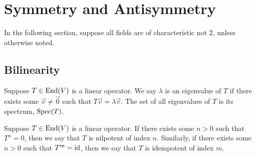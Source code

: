 \section{Symmetry and Antisymmetry}

\begin{remark}
    In the following section,
    suppose all fields are of characteristic not 2,
    unless otherwise noted.
\end{remark}

\subsection*{Bilinearity}

\begin{definition}
    Suppose \(T \in \operatorname{End}(V)\) is a linear operator.
    We say \(\lambda\) is an eigenvalue of \(T\)
    if there exists some \(\vec{v} \neq \vec{0}\) such that \(T\vec{v} = \lambda\vec{v}\).
    The set of all eigenvalues of \(T\) is its spectrum, \(\operatorname{Spec}(T)\).
\end{definition}
\begin{definition}
    Suppose \(T \in \operatorname{End}(V)\) is a linear operator.
    If there exists some \(n > 0\) such that \(T^n = 0\),
    then we say that \(T\) is nilpotent of index \(n\).
    Similarly, if there exists some \(n > 0\) such that \(T^m = \operatorname{id}\),
    then we say that \(T\) is idempotent of index \(m\).
\end{definition}

